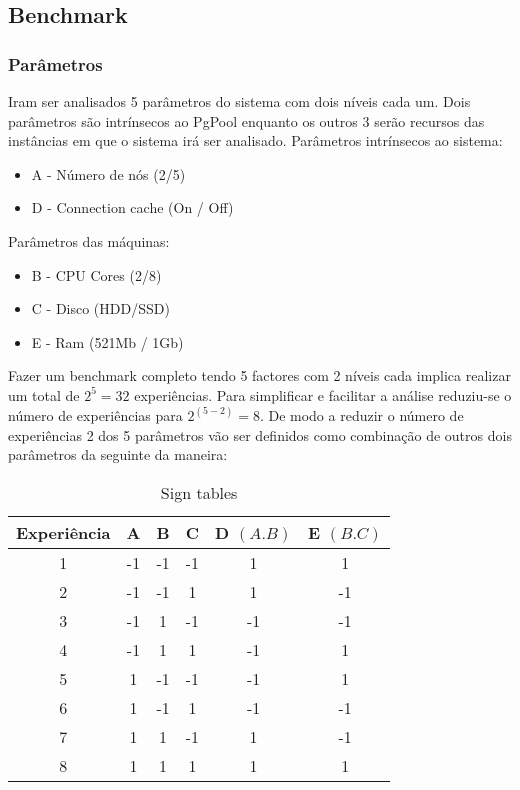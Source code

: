 
\subsection{Benchmark}
\subsubsection{Parâmetros}
Iram ser analisados 5 parâmetros do sistema com dois níveis cada um. Dois parâmetros são intrínsecos ao PgPool enquanto os outros 3 serão recursos das instâncias em que o sistema irá ser analisado.\newline
Parâmetros intrínsecos ao sistema:
\begin{itemize}
    \item A - Número de nós (2/5)
    \item D - Connection cache (On / Off)
\end{itemize}
Parâmetros das máquinas:
\begin{itemize}
    \item B - CPU Cores (2/8)
    \item C - Disco (HDD/SSD)
    \item E - Ram (521Mb / 1Gb)
\end{itemize}

Fazer um benchmark completo tendo 5 factores com 2 níveis cada implica realizar um total de $2^5=32$ experiências. Para simplificar e facilitar a análise reduziu-se o número de experiências para $2^{(5-2)}=8$. De modo a reduzir o número de experiências 2 dos 5 parâmetros vão ser definidos como combinação de outros dois parâmetros da seguinte da maneira:\newline

\begin{table}
    \centering
    \begin{tabular}{|| c | c | c | c | c | c ||} 
         \hline
          Experiência & A & B & C & D $(A.B)$ & E $(B.C)$ \\ [0.5ex] 
         \hline\hline
         1 & -1 & -1 & -1 & 1 & 1\\ 
         \hline
         2 & -1 & -1 & 1 & 1 & -1\\ 
         \hline
         3 & -1 & 1 & -1 & -1 & -1\\ 
         \hline
         4 & -1 & 1 & 1 & -1 & 1\\ 
         \hline
         5 & 1 & -1 & -1 & -1 & 1\\ 
         \hline
         6 & 1 & -1 & 1 & -1 & -1\\ 
         \hline
         7 & 1 & 1 & -1 & 1 & -1\\ 
         \hline
         8 & 1 & 1 & 1 & 1 & 1\\ 
        \hline
    \end{tabular}
    \caption{Sign tables}
\end{table}

